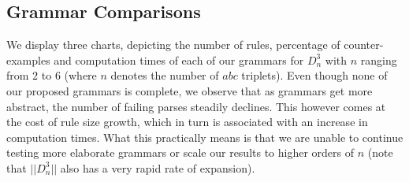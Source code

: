 \documentclass[nonatbib,numbers,10pt]{llncs}
\begin{document}
\subsection{Grammar Comparisons}
We display three charts, depicting the number of rules, percentage of counter-examples and computation times of each of our grammars for $D^3_n$ with $n$ ranging from $2$ to $6$ (where $n$ denotes the number of $abc$ triplets). Even though none of our proposed grammars is complete, we observe that as grammars get more abstract, the number of failing parses steadily declines. This however comes at the cost of rule size growth, which in turn is associated with an increase in computation times. What this practically means is that we are unable to continue testing more elaborate grammars or scale our results to higher orders of $n$ (note that $| \! | D^3_n | \! |$ also has a very rapid rate of expansion)\cite{moortgat}.
\end{document}

